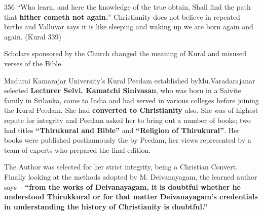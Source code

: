 356  “Who learn, and here the knowledge of the true obtain, Shall find the path that \textbf{hither cometh not again.}” Christianity does not believe in repeated births and Valluvar says it is like sleeping and waking up we are born again and again. (Kural 339)

Scholars sponsored by the Church changed the meaning of Kural and misused verses of the Bible.

Madurai Kamarajar University’s Kural Peedam established by\break Mu.Varadarajanar selected \textbf{Lecturer Selvi. Kamatchi Sinivasan}, who was born in a Saivite family in Srilanka, came to India and had served in various colleges before joining the Kural Peedam. She had \textbf{converted to Christianity} also. She was of highest repute for integrity and Peedam asked her to bring out a number of books; two had titles \textbf{“Thirukural and Bible”} and \textbf{“Religion of Thirukural”}. Her books were published posthumously the by Peedam, her views represented by a team of experts who prepared the final edition.

The Author was selected for her strict integrity, being a Christian Convert. Finally looking at the methods adopted by M. Deivanayagam, the learned author says – \textbf{“from the works of Deivanayagam, it is doubtful whether he understood Thirukkural or for that matter Deivanayagam’s credentials in understanding the history of Christianity is doubtful.”}

